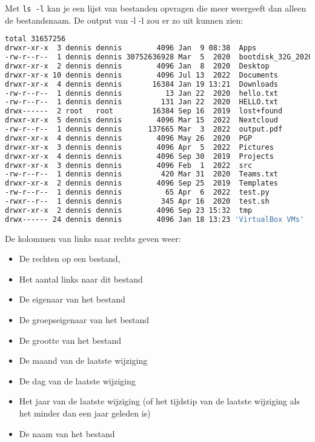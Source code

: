 Met \texttt{ls -l} kan je een lijst van bestanden opvragen die meer weergeeft dan alleen de bestandsnaam. De output van -l -l zou er zo uit kunnen zien:
\begin{lstlisting}[language=bash]
total 31657256
drwxr-xr-x  3 dennis dennis        4096 Jan  9 08:38  Apps
-rw-r--r--  1 dennis dennis 30752636928 Mar  5  2020  bootdisk_32G_20200305.img
drwxr-xr-x  2 dennis dennis        4096 Jan  8  2020  Desktop
drwxr-xr-x 10 dennis dennis        4096 Jul 13  2022  Documents
drwxr-xr-x  4 dennis dennis       16384 Jan 19 13:21  Downloads
-rw-r--r--  1 dennis dennis          13 Jan 22  2020  hello.txt
-rw-r--r--  1 dennis dennis         131 Jan 22  2020  HELLO.txt
drwx------  2 root   root         16384 Sep 16  2019  lost+found
drwxr-xr-x  5 dennis dennis        4096 Mar 15  2022  Nextcloud
-rw-r--r--  1 dennis dennis      137665 Mar  3  2022  output.pdf
drwxr-xr-x  4 dennis dennis        4096 May 26  2020  PGP
drwxr-xr-x  3 dennis dennis        4096 Apr  5  2022  Pictures
drwxr-xr-x  4 dennis dennis        4096 Sep 30  2019  Projects
drwxr-xr-x  3 dennis dennis        4096 Feb  1  2022  src
-rw-r--r--  1 dennis dennis         420 Mar 31  2020  Teams.txt
drwxr-xr-x  2 dennis dennis        4096 Sep 25  2019  Templates
-rw-r--r--  1 dennis dennis          65 Apr  6  2022  test.py
-rwxr--r--  1 dennis dennis         345 Apr 16  2020  test.sh
drwxr-xr-x  2 dennis dennis        4096 Sep 23 15:32  tmp
drwx------ 24 dennis dennis        4096 Jan 18 13:23 'VirtualBox VMs'
\end{lstlisting}

De kolommen van links naar rechts geven weer:
\begin{itemize}
\item De rechten op een bestand,
\item Het aantal links naar dit bestand
\item De eigenaar van het bestand
\item De groepseigenaar van het bestand
\item De grootte van het bestand
\item De maand van de laatste wijziging
\item De dag van de laatste wijziging
\item Het jaar van de laatste wijziging (of het tijdstip van de laatste wijziging als het minder dan een jaar geleden is)
\item De naam van het bestand
\end{itemize}
